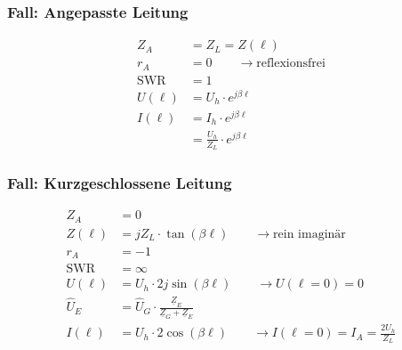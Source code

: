 \subsubsection{Fall: Angepasste Leitung}
\begin{align*}
    Z_A          & = Z_L = Z(\ell)                              \\
    r_A          & = 0\qquad\rightarrow\text{reflexionsfrei} \\
    \mathrm{SWR} & = 1                                       \\
    U(\ell)         & = U_h\cdot e ^{j\beta \ell}                  \\
    I(\ell)         & = I_h \cdot e^{j\beta \ell}                  \\
                 & = \frac{U_h}{Z_L}\cdot e^{j\beta \ell}
\end{align*}

\subsubsection{Fall: Kurzgeschlossene Leitung}
\begin{align*}
    Z_A          & = 0                                                                                         \\
    Z(\ell)         & = j Z_L\cdot\tan(\beta \ell)        \qquad\rightarrow\text{rein imaginär}                      \\
    r_A          & = -1                                                                                        \\
    \mathrm{SWR} & = \infty                                                                                    \\
    U(\ell)         & = U_h\cdot 2j\sin(\beta \ell)    \qquad\rightarrow U(\ell=0)=0                                    \\
    \hat{U}_E    & = \hat{U}_{G}\cdot\frac{\underline{Z}_E}{\underline{Z}_{G}+\underline{Z}_E} \\
    I(\ell)         & = U_h\cdot 2\cos(\beta \ell)    \qquad\rightarrow I(\ell=0)=I_A=\frac{2U_h}{Z_L}
\end{align*}

